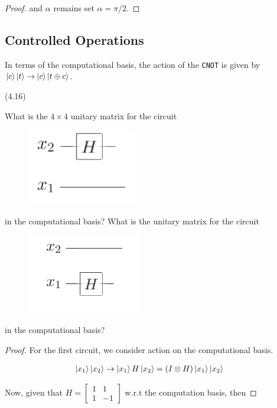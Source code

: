 \documentclass[main.tex]{subfiles}
\begin{document}
\begin{subappendices}
\begin{exercise}
\begin{proof}
and $\alpha$ remains set $\alpha = \pi / 2$.
\end{proof}	
\end{exercise}

\subsection{Controlled Operations} 

In terms of the computational basis, the action of the \texttt{CNOT} is given by $\ket{c}\ket{t} \rightarrow \ket{c} \ket{t \oplus c}$.

\begin{exercise}(4.16)

What is the $4\times 4$ unitary matrix for the circuit

\begin{figure}[H]
\centering
\includegraphics[width=.2\linewidth]{images/4_16-1.png}
\end{figure}

in the computational basis? What is the unitary matrix for the circuit

\begin{figure}[H]
\centering
\includegraphics[width=.25\linewidth]{images/4_16-2.png}
\end{figure}

in the computational basis?

\begin{proof}
	For the first circuit, we consider action on the computational basis.
	
	\begin{align*}
		\ket{x_1}\ket{x_2 } &\rightarrow \ket{x_1}H\ket{x_2} = (I \otimes H) \ket{x_1}\ket{x_2 }
	\end{align*}

Now, given that $H = \begin{bmatrix} 1 & 1 \\ 1 & -1\end{bmatrix}$ w.r.t the computation basis, then


\end{proof}
\end{exercise}
\end{subappendices}
\end{document}
